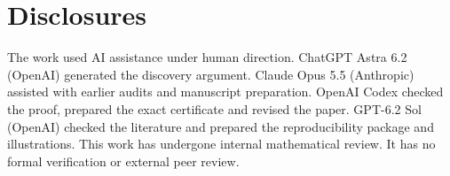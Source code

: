 \documentclass[11pt,a4paper]{amsart}
\begin{document}
\section*{Disclosures}
The work used AI assistance under human direction. ChatGPT Astra 6.2 (OpenAI) generated the discovery argument. Claude Opus 5.5 (Anthropic) assisted with earlier audits and manuscript preparation. OpenAI Codex checked the proof, prepared the exact certificate and revised the paper. GPT-6.2 Sol (OpenAI) checked the literature and prepared the reproducibility package and illustrations. This work has undergone internal mathematical review. It has no formal verification or external peer review.

\renewcommand{\bibliofont}{\normalsize}


\end{document}
